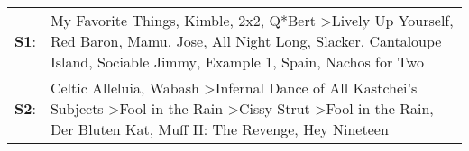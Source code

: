 \begin{supertabular}{p{0.03\textwidth}p{0.92\textwidth}}
 \textbf{S1}:  &  My Favorite Things\textsuperscript{}, \enspace Kimble\textsuperscript{}, \enspace 2x2\textsuperscript{}, \enspace Q*Bert\textsuperscript{} \textgreater \enspace Lively Up Yourself\textsuperscript{}, \enspace Red Baron\textsuperscript{}, \enspace Mamu\textsuperscript{}, \enspace Jose\textsuperscript{}, \enspace All Night Long\textsuperscript{}, \enspace Slacker\textsuperscript{}, \enspace Cantaloupe Island\textsuperscript{}, \enspace Sociable Jimmy\textsuperscript{}, \enspace Example 1\textsuperscript{}, \enspace Spain\textsuperscript{}, \enspace Nachos for Two\textsuperscript{}  \enspace  \\
 \textbf{S2}:  &                                                                                                                                         Celtic Alleluia\textsuperscript{}, \enspace Wabash\textsuperscript{} \textgreater \enspace Infernal Dance of All Kastchei's Subjects\textsuperscript{} \textgreater \enspace Fool in the Rain\textsuperscript{} \textgreater \enspace Cissy Strut\textsuperscript{} \textgreater \enspace Fool in the Rain\textsuperscript{}, \enspace Der Bluten Kat\textsuperscript{}, \enspace Muff II: The Revenge\textsuperscript{}, \enspace Hey Nineteen\textsuperscript{}  \enspace  \\
\end{supertabular}
